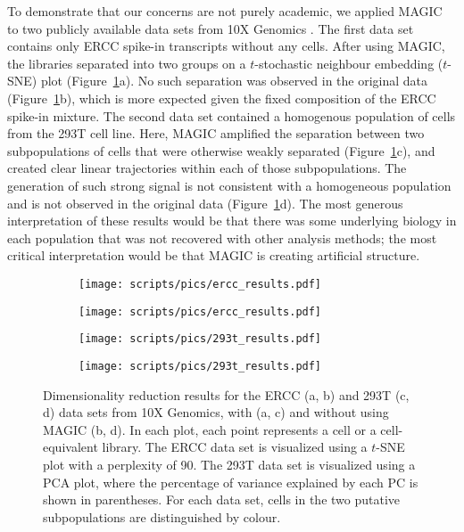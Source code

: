 \documentclass[10pt,letterpaper]{article}
\begin{document}
To demonstrate that our concerns are not purely academic, we applied MAGIC to two publicly available data sets from 10X Genomics \cite{zheng2017massively}.
The first data set contains only ERCC spike-in transcripts without any cells.
After using MAGIC, the libraries separated into two groups on a $t$-stochastic neighbour embedding ($t$-SNE) \cite{van2008visualizing} plot (Figure~\ref{fig:realdata}a).
No such separation was observed in the original data (Figure~\ref{fig:realdata}b), which is more expected given the fixed composition of the ERCC spike-in mixture.
The second data set contained a homogenous population of cells from the 293T cell line.
Here, MAGIC amplified the separation between two subpopulations of cells that were otherwise weakly separated (Figure~\ref{fig:realdata}c),
and created clear linear trajectories within each of those subpopulations.
The generation of such strong signal is not consistent with a homogeneous population and is not observed in the original data (Figure~\ref{fig:realdata}d).
The most generous interpretation of these results would be that there was some underlying biology in each population that was not recovered with other analysis methods;
the most critical interpretation would be that MAGIC is creating artificial structure.

\begin{figure}[btp]
\centering
\begin{subfigure}[b]{0.49\textwidth}
    \texttt{[image: scripts/pics/ercc\_results.pdf]}
    \caption{}
\end{subfigure}
\begin{subfigure}[b]{0.49\textwidth}
    \texttt{[image: scripts/pics/ercc\_results.pdf]}
    \caption{}
\end{subfigure}
\begin{subfigure}[b]{0.49\textwidth}
    \texttt{[image: scripts/pics/293t\_results.pdf]}
    \caption{}
\end{subfigure}
\begin{subfigure}[b]{0.49\textwidth}
    \texttt{[image: scripts/pics/293t\_results.pdf]}
    \caption{}
\end{subfigure}
\caption{Dimensionality reduction results for the ERCC (a, b) and 293T (c, d) data sets from 10X Genomics, with (a, c) and without using MAGIC (b, d).
In each plot, each point represents a cell or a cell-equivalent library.
The ERCC data set is visualized using a $t$-SNE plot with a perplexity of 90.
The 293T data set is visualized using a PCA plot, where the percentage of variance explained by each PC is shown in parentheses.
For each data set, cells in the two putative subpopulations are distinguished by colour.
}
\label{fig:realdata}
\end{figure}
\end{document}

